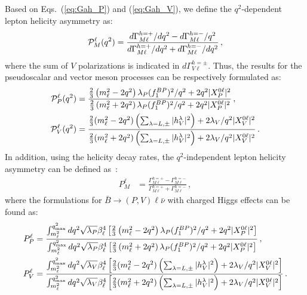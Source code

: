 \documentclass[prd,preprint,superscriptaddress,amsmath,amssymb]{revtex4}
\begin{document}
  
Based on Eqs.~(\ref{eq:Gah_P}) and (\ref{eq:Gah_V}), we define the $q^2$-dependent lepton helicity asymmetry as:
 \begin{equation}
 {\cal P}^\ell_{M} (q^2) = \frac{d\Gamma^{h=+}_{M\ell}/dq^2  - d\Gamma^{h=-}_{M\ell}/q^2}{d\Gamma^{h=+}_{M\ell} /dq^2+ d\Gamma^{h=-}_{M\ell}/dq^2}\,,
 \end{equation}
 where  the sum of $V$ polarizations is indicated in $d\Gamma^{h=\pm }_{V\ell}$. Thus, the results for the pseudoscalar and vector meson processes can be respectively formulated as:
  \begin{align}
   {\cal P}^\ell_{P} (q^2) &  = \frac{ \frac{2}{3} \left(m^2_{\ell} -2 q^2 \right) \lambda_P  ( f^{BP}_1)^2 /q^2 + 2  q^2  |X^{0\ell}_P|^2 }{ \frac{2}{3}   \left( m^2_{\ell}+ 2 q^2 \right) \lambda_P   (f^{BP}_1)^2/q^2 + 2  q^2 |X^{0\ell}_P|^2}\,,   \\
   {\cal P}^\ell_V (q^2) & = \frac{ \frac{2}{3} (m^2_\ell -2 q^2) \left( \sum_{\lambda=L,\pm} |h^{\lambda}_{V}|^2\right) + 2 \lambda_{V}/q^2 |X^{0\ell}_{V}|^2 }{ \frac{2}{3} (m^2_\ell + 2 q^2) \left( \sum_{\lambda=L,\pm} |h^{\lambda}_{V}|^2\right) + 2 \lambda_{V}/q^2 |X^{0\ell}_{V}|^2 }\,.
  \end{align}
In addition, using the helicity decay rates, the $q^2$-independent lepton helicity asymmetry can be defined as~\cite{Kalinowski:1990ba,Tanaka:2010se,Tanaka:2012nw,Datta:2012qk,Chen:2017eby}:
 \begin{align}
 P^{\ell}_{M} & = \frac{\Gamma^{h= +}_{M\ell} - \Gamma^{h=-}_{M\ell}}{ \Gamma^{h= +}_{M\ell} +  \Gamma^{h=-}_{M\ell} }\,,
  \end{align}
 where   the formulations for $\bar B\to (P, V) \ell \bar\nu$ with charged Higgs effects  can be found as: 
\begin{align}
 P^{\ell}_{P} & = \frac{\int^{q^2_{\rm max}}_{m^2_\ell} dq^2 \sqrt{\lambda_P} \beta^4_\ell \left[ \frac{2}{3} \left(m^2_{\ell} -2 q^2 \right) \lambda_P  ( f^{BP}_1)^2 /q^2 + 2  q^2  |X^{0\ell}_P|^2\right]}{\int^{q^2_{\rm max}}_{m^2_\ell} dq^2 \sqrt{\lambda_P} \beta^4_\ell \left[ \frac{2}{3}   \left( m^2_{\ell}+ 2 q^2 \right) \lambda_P   (f^{BP}_1)^2/q^2 + 2  q^2 |X^{0\ell}_P|^2\right]}\,,  \label{eq:PtauP}  \\
 P^{\ell}_{V} & =  \frac{\int^{q^2_{\rm max}}_{m^2_\ell} dq^2 \sqrt{\lambda_{V}} \beta^4_\ell\left[ \frac{2}{3} (m^2_\ell -2 q^2) \left( \sum_{\lambda=L,\pm} |h^{\lambda}_{V}|^2\right) + 2 \lambda_{V}/q^2 |X^{0\ell}_{V}|^2 \right]}{\int^{q^2_{\rm max}}_{m^2_\ell} dq^2 \sqrt{\lambda_{V}} \beta^4_\ell \left[ \frac{2}{3} (m^2_\ell + 2 q^2) \left( \sum_{\lambda=L,\pm} |h^{\lambda}_{V}|^2\right) + 2 \lambda_{V}/q^2 |X^{0\ell}_{V}|^2 \right]}\,. \label{eq:PtauV}
 \end{align}
 
\end{document}
